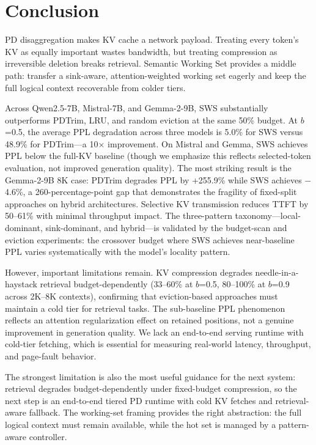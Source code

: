 \documentclass[11pt]{article}
\newcommand{\method}{SWS}
\newcommand{\fullmethod}{Semantic Working Set}
\newcommand{\sws}{SWS}
\newcommand{\pct}{\%}
\theoremstyle{definition}
\theoremstyle{plain}
\begin{document}
\section{Conclusion}
\label{sec:conclusion}

PD disaggregation makes KV cache a network payload.  Treating every token's KV as equally important wastes bandwidth, but treating compression as irreversible deletion breaks retrieval.  \fullmethod{} provides a middle path: transfer a sink-aware, attention-weighted working set eagerly and keep the full logical context recoverable from colder tiers.

Across Qwen2.5-7B, Mistral-7B, and Gemma-2-9B, \method{} substantially outperforms PDTrim, LRU, and random eviction at the same 50\pct{} budget.  At $b$=0.5, the average PPL degradation across three models is 5.0\pct{} for \sws{} versus 48.9\pct{} for PDTrim---a 10$\times$ improvement.  On Mistral and Gemma, \sws{} achieves PPL below the full-KV baseline (though we emphasize this reflects selected-token evaluation, not improved generation quality).  The most striking result is the Gemma-2-9B 8K case: PDTrim degrades PPL by +255.9\pct{} while \sws{} achieves $-$4.6\pct{}, a 260-percentage-point gap that demonstrates the fragility of fixed-split approaches on hybrid architectures.  Selective KV transmission reduces TTFT by 50--61\pct{} with minimal throughput impact.  The three-pattern taxonomy---local-dominant, sink-dominant, and hybrid---is validated by the budget-scan and eviction experiments: the crossover budget where \sws{} achieves near-baseline PPL varies systematically with the model's locality pattern.

However, important limitations remain.  KV compression degrades needle-in-a-haystack retrieval budget-dependently (33--60\pct{} at $b$=0.5, 80--100\pct{} at $b$=0.9 across 2K--8K contexts), confirming that eviction-based approaches must maintain a cold tier for retrieval tasks.  The sub-baseline PPL phenomenon reflects an attention regularization effect on retained positions, not a genuine improvement in generation quality.  We lack an end-to-end serving runtime with cold-tier fetching, which is essential for measuring real-world latency, throughput, and page-fault behavior.

The strongest limitation is also the most useful guidance for the next system: retrieval degrades budget-dependently under fixed-budget compression, so the next step is an end-to-end tiered PD runtime with cold KV fetches and retrieval-aware fallback.  The working-set framing provides the right abstraction: the full logical context must remain available, while the hot set is managed by a pattern-aware controller.
\end{document}
